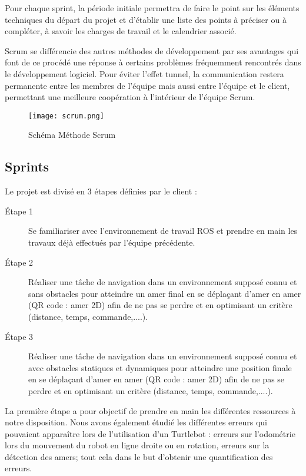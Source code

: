 \documentclass[10pt,a4paper]{article}
\begin{document}
Pour chaque sprint, la période initiale permettra de faire le point sur les éléments techniques du départ du projet et d'établir une liste des points à préciser ou à compléter, à savoir les charges de travail et le calendrier associé.

Scrum se différencie des autres méthodes de développement par ses avantages qui font de ce procédé une réponse à certains problèmes fréquemment rencontrés dans le développement logiciel. Pour éviter l’effet tunnel, la communication restera permanente entre les membres de l’équipe mais aussi entre l’équipe et le client, permettant une meilleure coopération à l’intérieur de l’équipe Scrum. 

\begin{figure}[!h]
  \centering
  \noindent\texttt{[image: scrum.png]} 
  \caption{Schéma Méthode Scrum}
\end{figure}

\subsection{Sprints}

\noindent Le projet est divisé en 3 étapes définies par le client : 

\begin{description}

\item [Étape 1] Se familiariser avec l'environnement de travail ROS et prendre en main les travaux déjà effectués par l'équipe précédente.

\item [Étape 2] Réaliser une tâche de navigation dans un environnement supposé connu et sans obstacles pour atteindre un amer final en se déplaçant d’amer en amer (QR code : amer 2D) afin de ne pas se perdre et en optimisant un critère (distance, temps, commande,....).

\item [Étape 3] Réaliser une tâche de navigation dans un environnement supposé connu et avec obstacles statiques et dynamiques pour atteindre une position finale en se déplaçant d’amer en amer (QR code : amer 2D) afin de ne pas se perdre et en optimisant un critère (distance, temps, commande,....).

\end{description}

La première étape a pour objectif de prendre en main les différentes ressources à notre disposition. Nous avons également étudié les différentes erreurs qui pouvaient apparaître lors de l'utilisation d'un Turtlebot : erreurs sur l'odométrie lors du mouvement du robot en ligne droite ou en rotation, erreurs sur la détection des amers; tout cela dans le but d'obtenir une quantification des erreurs.
\end{document}
